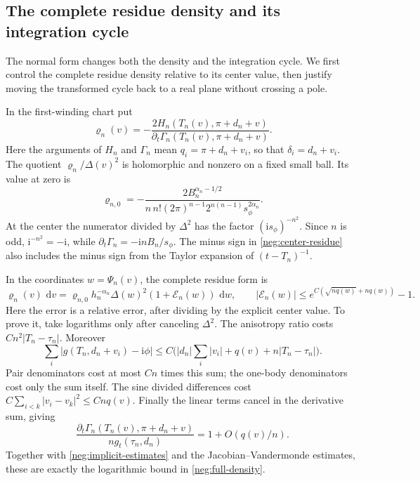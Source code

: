 \documentclass[11pt]{article}
\numberwithin{equation}{section}
\theoremstyle{definition}
\newcommand{\ii}{\mathrm i}
\newcommand{\dd}{\,\mathrm d}
\begin{document}
\subsection{The complete residue density and its integration cycle}
\label{neg:density-cycle}

The normal form changes both the density and the integration cycle.
We first control the complete residue density relative to its center
value, then justify moving the transformed cycle back to a real
plane without crossing a pole.

In the first-winding chart put
\[
 \varrho_n(v)=
 -\frac{2H_n(T_n(v),\pi+d_n+v)}
        {\partial_t\Gamma_n(T_n(v),\pi+d_n+v)} .
 \]
Here the arguments of \(H_n\) and \(\Gamma_n\) mean
\(q_i=\pi+d_n+v_i\), so that \(\delta_i=d_n+v_i\).
The quotient
\(\varrho_n/\Delta(v)^2\) is holomorphic and nonzero on a
fixed small ball.  Its value at zero is
\begin{equation}
 \varrho_{n,0}=
 -\frac{2B_n^{\alpha_n-1/2}}
 {n\,n!(2\pi)^{n-1}2^{n(n-1)}s_\phi^{2\alpha_n}} .
 \label{neg:center-residue}
\end{equation}
At the center the numerator divided by \(\Delta^2\) has the factor
\((\ii s_\phi)^{-n^2}\).
Since \(n\) is odd, \(\ii^{-n^2}=-\ii\), while
\(\partial_t\Gamma_n=-\ii nB_n/s_\phi\).
The minus sign in \eqref{neg:center-residue} also includes
the minus sign from the Taylor expansion of \((t-T_n)^{-1}\).

In the coordinates \(w=\Psi_n(v)\), the complete residue form is
\begin{equation}
 \varrho_n(v)\,\dd v
  =\varrho_{n,0}h_n^{-\alpha_n}
       \Delta(w)^2(1+\mathcal E_n(w))\,\dd w,
 \qquad
 |\mathcal E_n(w)|
 \le e^{C(\sqrt{nq(w)}+nq(w))}-1 .
 \label{neg:full-density}
\end{equation}
Here the error is a relative error, after dividing by the
explicit center value.  To prove it, take logarithms only
after canceling \(\Delta^2\).  The anisotropy ratio costs
\(Cn^2|T_n-\tau_n|\).  Moreover
\[
 \sum_i|g(T_n,d_n+v_i)-\ii\phi|
 \le C\bigl(|d_n|\sum_i|v_i|+q(v)
                                  +n|T_n-\tau_n|\bigr).
 \]
Pair denominators cost at most \(Cn\) times this sum;
the one-body denominators cost only the sum itself.
The sine divided differences cost
\(C\sum_{i<k}|v_i-v_k|^2\le Cnq(v)\).
Finally the linear terms cancel in the derivative sum, giving
\[
 \frac{\partial_t\Gamma_n(T_n(v),\pi+d_n+v)}
      {n g_t(\tau_n,d_n)}
      =1+O(q(v)/n).
 \]
Together with \eqref{neg:implicit-estimates} and the
Jacobian--Vandermonde estimates, these are exactly the
logarithmic bound in \eqref{neg:full-density}.
\end{document}
